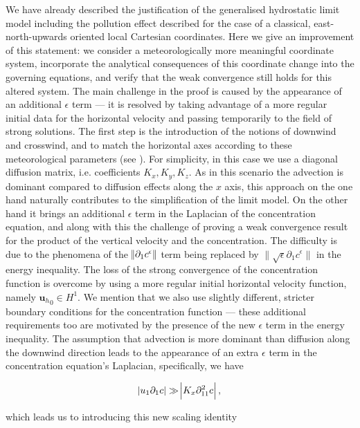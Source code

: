 \documentclass[11pt]{article}
\begin{document}
We have already described the justification of the generalised hydrostatic limit model including the pollution effect described for the case of a classical, east-north-upwards oriented local Cartesian coordinates. Here we give an improvement of this statement: we consider a meteorologically more meaningful coordinate system, incorporate the analytical consequences of this coordinate change into the governing equations, and verify that the weak convergence still holds for this altered system. The main challenge in the proof is caused by the appearance of an additional $\epsilon$ term --- it is resolved by taking advantage of a more regular initial data for the horizontal velocity and passing temporarily to the field of strong solutions.
The first step is the introduction of the notions of downwind and crosswind, and to match the horizontal axes according to these meteorological parameters (see \cite{goyal2011mathematical}). For simplicity, in this case we use a diagonal diffusion matrix, i.e. coefficients $K_x, K_y, K_z.$ As in this scenario the advection is dominant compared to diffusion effects along the $x$ axis, this approach on the one hand naturally contributes to the simplification of the limit model. On the other hand it brings an additional $\epsilon$ term in the Laplacian of the concentration equation, and along with this the challenge of proving a weak convergence result for the product of the vertical velocity and the concentration. The difficulty is due to the phenomena of the $\norm{\partial_1 c^\epsilon}$ term being replaced by $\| \sqrt{\epsilon} \partial_1 c^\epsilon \|$ in the energy inequality. The loss of the strong convergence of the concentration function is overcome by using a more regular initial horizontal velocity function, namely ${\mathbf{u}_h}_0 \in H^1.$ We mention that we also use slightly different, stricter boundary conditions for the concentration function --- these additional requirements too are motivated by the presence of the new $\epsilon$ term in the energy inequality. The assumption that advection is more dominant than diffusion along the downwind direction leads to the appearance of an extra $\epsilon$ term in the concentration equation's Laplacian, specifically, we have

\begin{equation} \abs{u_1 \partial_{1} c} \gg \abs{ K_x \partial_{11} ^2 c },\end{equation}

which leads us to introducing this new scaling identity
\end{document}
